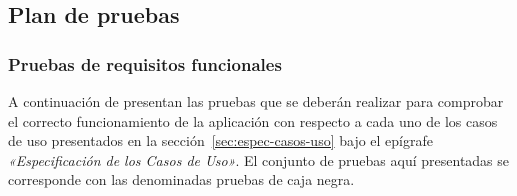 
\subsection{Plan de pruebas}

\subsubsection{Pruebas de requisitos funcionales}

A continuación de presentan las pruebas que se deberán realizar para comprobar 
el correcto funcionamiento de la aplicación con respecto a cada uno de los 
casos de uso presentados en la sección~\ref{sec:espec-casos-uso} bajo el
epígrafe \emph{«Especificación de los Casos de Uso»}. El conjunto de pruebas 
aquí presentadas se corresponde con las denominadas pruebas de caja negra. 


